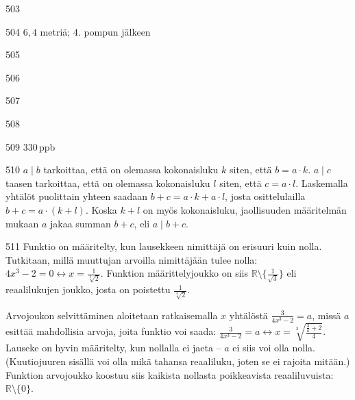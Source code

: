 \begin{Vastaus}{503}
	
\end{Vastaus}
\begin{Vastaus}{504}
	 $6,4$ metriä; $4$. pompun jälkeen
	
\end{Vastaus}
\begin{Vastaus}{505}
	
\end{Vastaus}
\begin{Vastaus}{506}
	
\end{Vastaus}
\begin{Vastaus}{507}
	
\end{Vastaus}
\begin{Vastaus}{508}
	
\end{Vastaus}
\begin{Vastaus}{509}
	$330$\,ppb %
	
\end{Vastaus}
\begin{Vastaus}{510}
	$a	\mid b$ tarkoittaa, että on olemassa kokonaisluku $k$ siten, että $b=a\cdot k$. $a \mid c$ taasen tarkoittaa, että on olemassa kokonaisluku $l$ siten, että $c=a\cdot l$. Laskemalla yhtälöt puolittain yhteen saadaan $b+c=a\cdot k + a\cdot l$, josta osittelulailla $b+c=a\cdot (k+l)$. Koska $k+l$ on myös kokonaisluku, jaollisuuden määritelmän mukaan $a$ jakaa summan $b+c$, eli $a\mid b+c$.
	
\end{Vastaus}
\begin{Vastaus}{511}
Funktio on määritelty, kun lausekkeen nimittäjä on erisuuri kuin nolla. Tutkitaan, millä muuttujan arvoilla nimittäjään tulee nolla: $4x^3-2=0 \leftrightarrow x=\frac{1}{\sqrt[3]{2}}$. Funktion määrittelyjoukko on siis $\mathbb{R}\setminus\lbrace\frac{1}{\sqrt{3}} \rbrace$ eli reaalilukujen joukko, josta on poistettu $\frac{1}{\sqrt[3]{2}}$.

Arvojoukon selvittäminen aloitetaan ratkaisemalla $x$ yhtälöstä $\frac{3}{4x^3-2}=a$, missä $a$ esittää mahdollisia arvoja, joita funktio voi saada: $\frac{3}{4x^3-2}=a \leftrightarrow x= \sqrt[3]{\frac{\frac{3}{a}+2}{4}}$. Lauseke on hyvin määritelty, kun nollalla ei jaeta -- $a$ ei siis voi olla nolla. (Kuutiojuuren sisällä voi olla mikä tahansa reaaliluku, joten se ei rajoita mitään.) Funktion arvojoukko koostuu siis kaikista nollasta poikkeavista reaaliluvuista: $\mathbb{R}\setminus \lbrace 0 \rbrace$.
	
\end{Vastaus}
